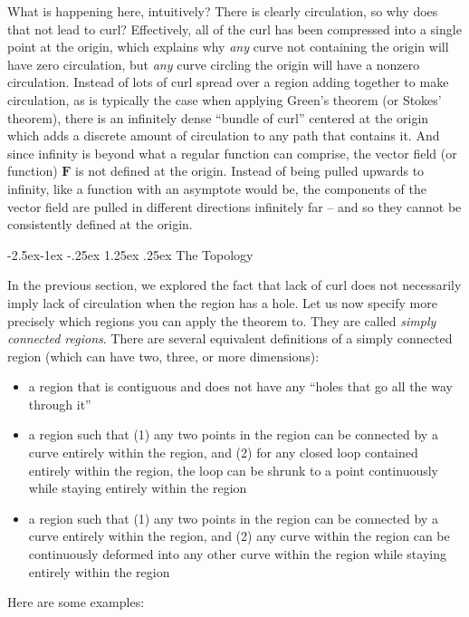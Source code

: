 \documentclass{myarticle}
\makeatletter
\newcommand\subsubsubsection{\@startsection{paragraph}{4}{\z@}%
  {-2.5ex\@plus -1ex \@minus -.25ex}%
  {1.25ex \@plus .25ex}%
  {\normalfont\normalsize\bfseries}}
\renewcommand{\vec}[1]{\mathbf{#1}}
\theoremstyle{nospace}
\newtheorem{old series theorem}{Theorem}
\newenvironment{series theorem}
{\begin{mdframed}\begin{old series theorem}}
    {\end{old series theorem}\end{mdframed}}
\makeatother
\begin{document}
What is happening here, intuitively? There is clearly circulation, so
why does that not lead to curl? Effectively, all of the curl has been
compressed into a single point at the origin, which explains why
\textit{any} curve not containing the origin will have zero
circulation, but \textit{any} curve circling the origin will have a
nonzero circulation. Instead of lots of curl spread over a region
adding together to make circulation, as is typically the case when
applying Green's theorem (or Stokes' theorem), there is an infinitely
dense ``bundle of curl'' centered at the origin which adds a discrete
amount of circulation to any path that contains it. And since infinity
is beyond what a regular function can comprise, the vector field (or
function) $\vec{F}$ is not defined at the origin. Instead of being
pulled upwards to infinity, like a function with an asymptote would
be, the components of the vector field are pulled in different
directions infinitely far -- and so they cannot be consistently
defined at the origin.

\subsubsubsection{The Topology}
\label{sec:no curl topology}

In the previous section, we explored the fact that lack of curl does
not necessarily imply lack of circulation when the region has a hole.
Let us now specify more precisely which regions you can apply the
theorem to. They are called \textit{simply connected regions}. There
are several equivalent definitions of a simply connected region (which
can have two, three, or more dimensions):

\begin{itemize}
\item a region that is contiguous and does not have any ``holes that
  go all the way through it''
\item a region such that (1) any two points in the region can be
  connected by a curve entirely within the region, and (2) for any
  closed loop contained entirely within the region, the loop can be
  shrunk to a point continuously while staying entirely within the
  region
\item a region such that (1) any two points in the region can be
  connected by a curve entirely within the region, and (2) any curve
  within the region can be continuously deformed into any other curve
  within the region while staying entirely within the region
\end{itemize}

Here are some examples:
\end{document}
